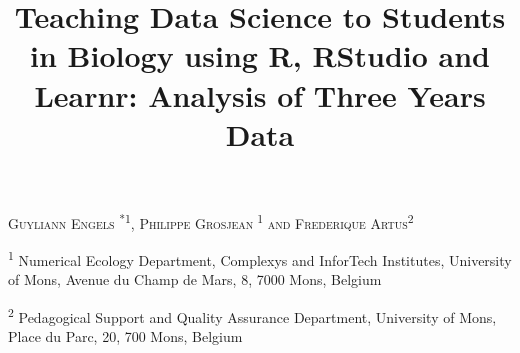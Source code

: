 \documentclass{aims} %
\title[Teaching Data Science in Biology]
{Teaching Data Science to Students in Biology using R, RStudio and
Learnr: Analysis of Three Years
Data} %
\author[Guyliann Engels, Philippe Grosjean and Frédérique Artus]{}
\theoremstyle{definition}
\begin{document}
\maketitle

\centerline{\scshape
Guyliann Engels \textsuperscript{{{\href{mailto:Guyliann.Engels@umons.ac.be}{\textrm{\Letter}}} *1}}, Philippe Grosjean\textsuperscript{{\href{mailto:Philippe.Grosjean@umons.ac.be}{\textrm{\Letter}}} 1} and Frederique Artus\textsuperscript{{\href{mailto:Frederique.Artus@umons.ac.be}{\textrm{\Letter}}}2}}

\medskip

{\footnotesize
 \centerline{\textsuperscript{1} Numerical Ecology Department, Complexys and InforTech Institutes, University of Mons, Avenue du Champ de Mars, 8, 7000 Mons, Belgium}
} %

\medskip

{\footnotesize
 \centerline{\textsuperscript{2} Pedagogical Support and Quality Assurance Department, University of Mons, Place du Parc, 20, 700 Mons, Belgium}
}

\bigskip


\end{document}
